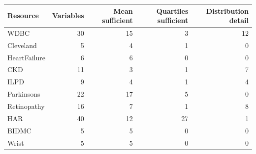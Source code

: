 \begin{tabular}{lrrrr}\toprule Resource & Variables & Mean sufficient & Quartiles sufficient & Distribution detail\\\midrule
WDBC & 30 & 15 & 3 & 12\\
Cleveland & 5 & 4 & 1 & 0\\
HeartFailure & 6 & 6 & 0 & 0\\
CKD & 11 & 3 & 1 & 7\\
ILPD & 9 & 4 & 1 & 4\\
Parkinsons & 22 & 17 & 5 & 0\\
Retinopathy & 16 & 7 & 1 & 8\\
HAR & 40 & 12 & 27 & 1\\
BIDMC & 5 & 5 & 0 & 0\\
Wrist & 5 & 5 & 0 & 0\\
\bottomrule\end{tabular}